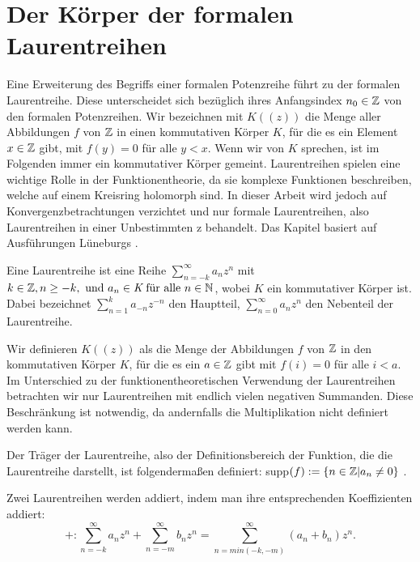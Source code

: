 
\section{Der Körper der formalen Laurentreihen}
%
Eine Erweiterung des Begriffs einer formalen Potenzreihe führt zu der formalen Laurentreihe. Diese unterscheidet sich bezüglich ihres Anfangsindex $n_0 \in \mathbb{Z}$ von den formalen Potenzreihen. Wir bezeichnen mit $K((z))$ die Menge aller Abbildungen $f$ von $\mathbb{Z}$ in einen kommutativen Körper $K$, für die es ein Element $x \in \mathbb{Z}$ gibt, mit $f(y) = 0$ für alle $y < x $. Wenn wir von $K$ sprechen, ist im Folgenden immer ein kommutativer Körper gemeint. \newline 
Laurentreihen spielen eine wichtige Rolle in der Funktionentheorie, da sie komplexe Funktionen beschreiben, welche auf einem Kreisring holomorph sind. In dieser Arbeit wird jedoch auf Konvergenzbetrachtungen verzichtet und nur formale Laurentreihen, also Laurentreihen in einer Unbestimmten z behandelt. %
Das Kapitel basiert auf Ausführungen Lüneburgs \cite[S. 563 - 572]{Lueneburg08}.
%
\begin{defn}
Eine Laurentreihe ist eine Reihe $\sum_{n= - k}^{\infty}a_nz^n$ mit $k \in \mathbb{Z}, n \ge -k, \text{ und }a_n \in\textit{K}\text{ für alle } n\in\mathbb{N} $, wobei $K$ ein kommutativer Körper ist. Dabei bezeichnet $\sum_{n=1}^{k}a_{-n}z^{-n}$ den Hauptteil, $\sum_{n=0}^{\infty}a_nz^n$ den Nebenteil der Laurentreihe. 
\end{defn}
%
Wir definieren $K((z))$ als die Menge der Abbildungen $f$ von $\mathbb{Z}$ in den kommutativen Körper $K$, für die es ein $a \in \mathbb{Z}$ gibt mit $f(i) = 0$ für alle $i < a$. 
Im Unterschied zu der funktionentheoretischen Verwendung der Laurentreihen betrachten wir nur Laurentreihen mit endlich vielen negativen Summanden. Diese Beschränkung ist notwendig, da andernfalls die Multiplikation nicht definiert werden kann. 
\begin{defn}\label{traeger}
Der Träger der Laurentreihe, also der Definitionsbereich der Funktion, die die Laurentreihe darstellt, ist folgendermaßen definiert: supp$(f) := \lbrace n \in \mathbb{Z} | a_n \neq 0 \rbrace$ . 
\end{defn}
Zwei Laurentreihen werden addiert, indem man ihre entsprechenden Koeffizienten addiert: 
%
\[
+ : \sum_{n=-k}^\infty a_n z^n  +  \sum_{n=-m}^\infty b_n z^n = \sum_{n = min(-k, -m)}^{\infty}(a_n + b_n) z^n.\] 
%

